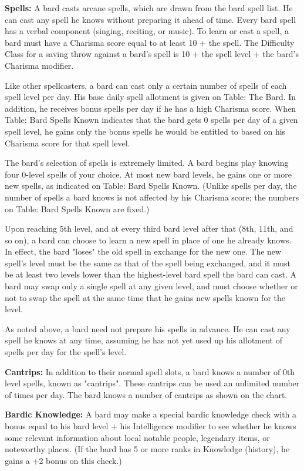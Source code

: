 \textbf{Spells:} A bard casts arcane spells, which are drawn from the bard spell list. He can cast any spell he knows without preparing it ahead of time. Every bard spell has a verbal component (singing, reciting, or music). To learn or cast a spell, a bard must have a Charisma score equal to at least 10 + the spell. The Difficulty Class for a saving throw against a bard's spell is 10 + the spell level + the bard's Charisma modifier.

Like other spellcasters, a bard can cast only a certain number of spells of each spell level per day. His base daily spell allotment is given on Table: The Bard. In addition, he receives bonus spells per day if he has a high Charisma score. When Table: Bard Spells Known indicates that the bard gets 0 spells per day of a given spell level, he gains only the bonus spells he would be entitled to based on his Charisma score for that spell level.

The bard's selection of spells is extremely limited. A bard begins play knowing four 0-level spells of your choice. At most new bard levels, he gains one or more new spells, as indicated on Table: Bard Spells Known. (Unlike spells per day, the number of spells a bard knows is not affected by his Charisma score; the numbers on Table: Bard Spells Known are fixed.)

Upon reaching 5th level, and at every third bard level after that (8th, 11th, and so on), a bard can choose to learn a new spell in place of one he already knows. In effect, the bard "loses" the old spell in exchange for the new one. The new spell's level must be the same as that of the spell being exchanged, and it must be at least two levels lower than the highest-level bard spell the bard can cast. A bard may swap only a single spell at any given level, and must choose whether or not to swap the spell at the same time that he gains new spells known for the level.

As noted above, a bard need not prepare his spells in advance. He can cast any spell he knows at any time, assuming he has not yet used up his allotment of spells per day for the spell's level.

\textbf{Cantrips:} In addition to their normal spell slots, a bard knows a number of 0th level spells, known as "cantrips". These cantrips can be used an unlimited number of times per day. The bard knows a number of cantrips as shown on the chart.

\textbf{Bardic Knowledge:} A bard may make a special bardic knowledge check with a bonus equal to his bard level + his Intelligence modifier to see whether he knows some relevant information about local notable people, legendary items, or noteworthy places. (If the bard has 5 or more ranks in Knowledge (history), he gains a +2 bonus on this check.)


